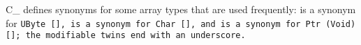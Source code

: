 C\_ defines synonyms for some array types that are used frequently:
 is a synonym for \tt{UByte []},  is a synonym
for \tt{Char []}, and  is a synonym for \tt{Ptr (Void) []};
the modifiable twins end with an underscore.
